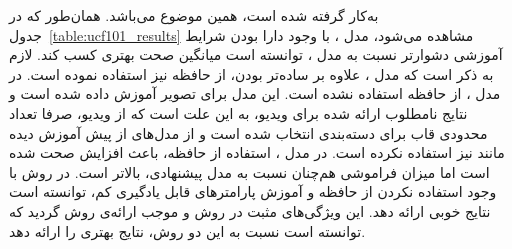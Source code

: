  به‌کار گرفته شده است، همین موضوع می‌باشد. همان‌طور که در جدول~\ref{table:ucf101_results} مشاهده می‌شود،  مدل ، با وجود دارا بودن شرایط آموزشی دشوارتر نسبت به مدل ، توانسته است میانگین صحت بهتری کسب کند. لازم به ذکر است که مدل ، علاوه بر ساده‌تر بودن، از حافظه نیز استفاده نموده است. در مدل ، از حافظه استفاده نشده است. این مدل برای تصویر آموزش داده شده است و نتایج نامطلوب ارائه شده برای ویدیو، به این علت است که از ویدیو، صرفا تعداد محدودی قاب برای دسته‌بندی انتخاب شده است و از مدل‌های از پیش آموزش دیده مانند  نیز استفاده نکرده است. در مدل ، استفاده از حافظه، باعث افزایش صحت شده است اما میزان فراموشی هم‌چنان نسبت به مدل پیشنهادی، بالاتر است. در روش  با وجود استفاده نکردن از حافظه و آموزش پارامترهای قابل یادگیری کم، توانسته است نتایج خوبی ارائه دهد. این ویژگی‌های مثبت در روش  و  موجب ارائه‌ی روش 
 گردید که توانسته است نسبت به این دو روش، نتایج بهتری را ارائه دهد.
 
